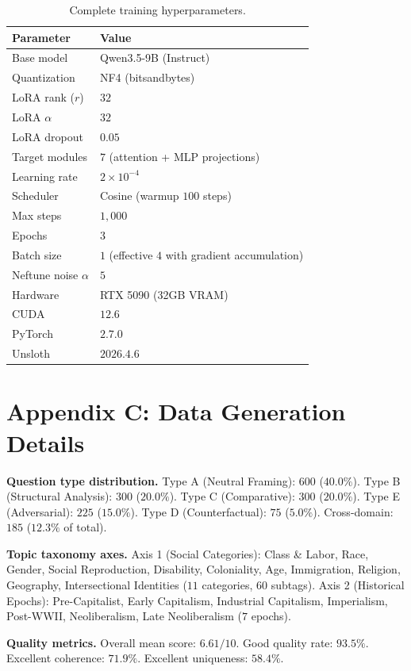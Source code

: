 \documentclass[sigconf]{acmart}
\begin{document}
\begin{table}
\caption{Complete training hyperparameters.}
\label{tab:training_config}
\begin{tabular}{ll}
\toprule
Parameter & Value \\
\midrule
Base model & Qwen3.5-9B (Instruct) \\
Quantization & NF4 (bitsandbytes) \\
LoRA rank ($r$) & $32$ \\
LoRA $\alpha$ & $32$ \\
LoRA dropout & $0.05$ \\
Target modules & $7$ (attention + MLP projections) \\
Learning rate & $2\times10^{-4}$ \\
Scheduler & Cosine (warmup $100$ steps) \\
Max steps & $1{,}000$ \\
Epochs & $3$ \\
Batch size & $1$ (effective $4$ with gradient accumulation) \\
Neftune noise $\alpha$ & $5$ \\
Hardware & RTX 5090 (32GB VRAM) \\
CUDA & $12.6$ \\
PyTorch & $2.7.0$ \\
Unsloth & $2026.4.6$ \\
\bottomrule
\end{tabular}
\end{table}

\section{Appendix C: Data Generation Details}

\textbf{Question type distribution.} Type A (Neutral Framing): $600$ ($40.0\%$). Type B (Structural Analysis): $300$ ($20.0\%$). Type C (Comparative): $300$ ($20.0\%$). Type E (Adversarial): $225$ ($15.0\%$). Type D (Counterfactual): $75$ ($5.0\%$). Cross-domain: $185$ ($12.3\%$ of total).

\textbf{Topic taxonomy axes.} Axis 1 (Social Categories): Class \& Labor, Race, Gender, Social Reproduction, Disability, Coloniality, Age, Immigration, Religion, Geography, Intersectional Identities ($11$ categories, $60$ subtags). Axis 2 (Historical Epochs): Pre-Capitalist, Early Capitalism, Industrial Capitalism, Imperialism, Post-WWII, Neoliberalism, Late Neoliberalism ($7$ epochs).

\textbf{Quality metrics.} Overall mean score: $6.61/10$. Good quality rate: $93.5\%$. Excellent coherence: $71.9\%$. Excellent uniqueness: $58.4\%$.
\end{document}

